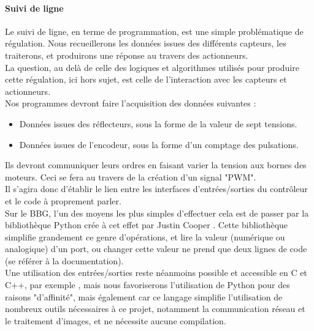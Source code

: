 		\paragraph{Suivi de ligne}

			Le suivi de ligne, en terme de programmation, est une simple problématique de régulation. Nous recueillerons les données issues des différents capteurs, les traiterons, et produirons une réponse au travers des actionneurs.\\

			La question, au delà de celle des logiques et algorithmes utilisés pour produire cette régulation, ici hors sujet, est celle de l’interaction avec les capteurs et actionneurs.\\

			Nos programmes devront faire l'acquisition des données suivantes :
			\begin{itemize}
				\item Données issues des réflecteurs, sous la forme de la valeur de sept tensions.
				\item Données issues de l'encodeur, sous la forme d'un comptage des pulsations.
			\end{itemize}

			Ils devront communiquer leurs ordres en faisant varier la tension aux bornes des moteurs. Ceci se fera au travers de la création d'un signal "PWM".\\

			Il s'agira donc d'établir le lien entre les interfaces d'entrées/sorties du contrôleur et le code à proprement parler.\\

			Sur le BBG, l'un des moyens les plus simples d'effectuer cela est de passer par la bibliothèque Python crée à cet effet par Justin Cooper \cite{bib14} \cite{bib15}. Cette bibliothèque simplifie grandement ce genre d'opérations, et lire la valeur (numérique ou analogique) d'un port, ou changer cette valeur ne prend que deux lignes de code (se référer à la documentation).\\

			Une utilisation des entrées/sorties reste néanmoins possible et accessible en C et C++, par exemple \cite{bib16}, mais nous favoriserons l'utilisation de Python pour des raisons "d'affinité", mais également car ce langage simplifie l'utilisation de nombreux outils nécessaires à ce projet, notamment la communication réseau et le traitement d'images, et ne nécessite aucune compilation.\\

